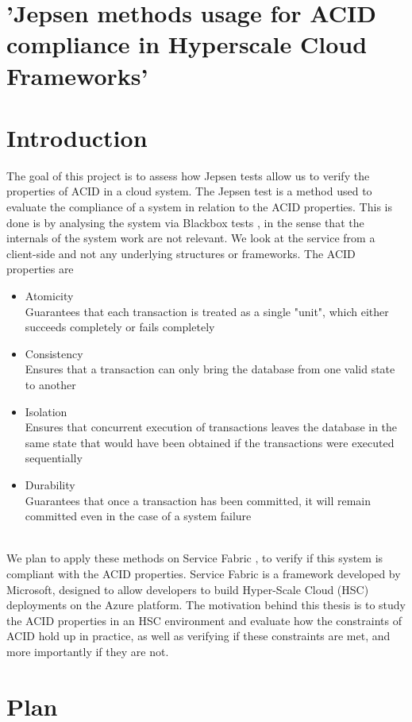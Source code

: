 \section{'Jepsen methods usage for ACID compliance in Hyperscale Cloud Frameworks'}

\section{Introduction}
The goal of this project is to assess how Jepsen\cite{2} tests allow us to verify the properties of ACID\cite{8} in a cloud system. 
The Jepsen test is a method used to evaluate the compliance of a system in relation to the ACID properties. This is done is by analysing the system via Blackbox\cite{4} tests , in the sense that the internals of the system work are not relevant. We look at the service from a client-side and not any underlying structures or frameworks.  
The ACID properties are 
\begin{itemize}
\item	Atomicity \\
Guarantees that each transaction is treated as a single "unit", which either succeeds completely or fails completely 
\item	Consistency \\
Ensures that a transaction can only bring the database from one valid state to another
\item	Isolation \\
Ensures that concurrent execution of transactions leaves the database in the same state that would have been obtained if the transactions were executed sequentially 
\item	Durability \\
Guarantees that once a transaction has been committed, it will remain committed even in the case of a system failure 
\end{itemize}
\cite{8} \\
We plan to apply these methods on Service Fabric\cite{5} , to verify if this system is compliant with the ACID properties. Service Fabric is a framework developed by Microsoft, designed to allow developers to build Hyper-Scale Cloud (HSC) deployments on the Azure\cite{6} platform.    
The motivation behind this thesis is to study the ACID properties in an HSC environment and evaluate how the constraints of ACID hold up in practice, as well as verifying if these constraints are met, and more importantly if they are not. 
\section{Plan}
     

